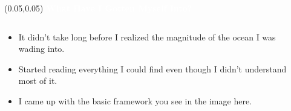 \documentclass[aspectratio=169]{beamer} %
\begin{document}
\begin{frame}{}
    \setlength{\TPHorizModule}{\textwidth}
    \setlength{\TPVertModule}{\textwidth}
    \begin{textblock}{0.74} (0.05,0.05)
        \bfseries\large\textcolor{white}{What Have I Gotten Myself Into?}
    \end{textblock}
    \begin{columns}
    \begin{column}{0.5\textwidth}
        \begin{itemize}
            \item It didn't take long before I realized the magnitude of the ocean I was wading into.
            \item Started reading everything I could find even though I didn't understand most of it.
            \item I came up with the basic framework you see in the image here.
        \end{itemize}
    \end{column}
    \begin{column}{0.45\textwidth}
        \begin{center}

\end{center}
\end{column}
\end{columns}
\end{frame}
\end{document}
